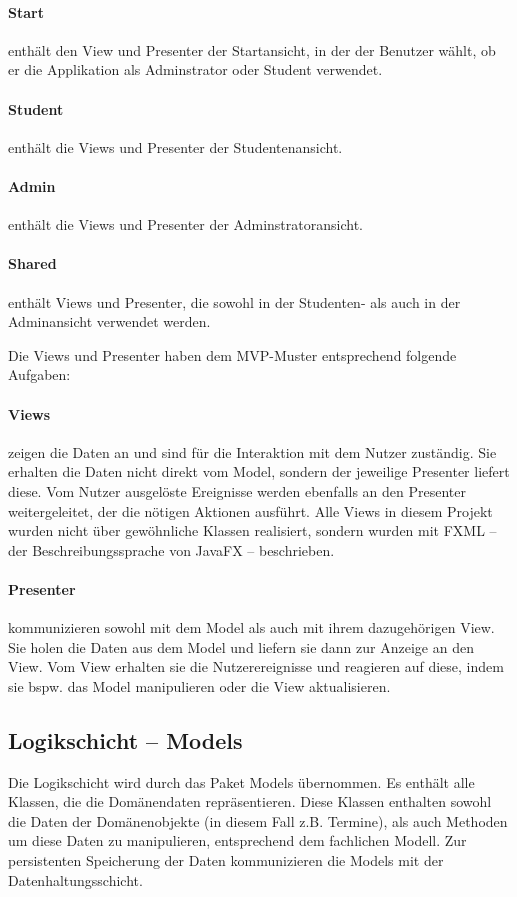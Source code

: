 \paragraph{Start} enthält den View und Presenter der Startansicht, in der der Benutzer wählt, ob er die Applikation als Adminstrator oder Student verwendet.
\paragraph{Student} enthält die Views und Presenter der Studentenansicht.
\paragraph{Admin} enthält die Views und Presenter der Adminstratoransicht.
\paragraph{Shared} enthält Views und Presenter, die sowohl in der Studenten- als auch in der Adminansicht verwendet werden.

Die Views und Presenter haben dem MVP-Muster entsprechend folgende Aufgaben:
\paragraph{Views} zeigen die Daten an und sind für die Interaktion mit dem Nutzer zuständig. Sie erhalten die Daten nicht direkt vom Model, sondern der jeweilige Presenter liefert diese. Vom Nutzer ausgelöste Ereignisse werden ebenfalls an den Presenter weitergeleitet, der die nötigen Aktionen ausführt. Alle Views in diesem Projekt wurden nicht über gewöhnliche Klassen realisiert, sondern wurden mit FXML – der Beschreibungssprache von JavaFX – beschrieben.
\paragraph{Presenter} kommunizieren sowohl mit dem Model als auch mit ihrem dazugehörigen View. Sie holen die Daten aus dem Model und liefern sie dann zur Anzeige an den View. Vom View erhalten sie die Nutzerereignisse und reagieren auf diese, indem sie bspw. das Model manipulieren oder die View aktualisieren.

\subsection{Logikschicht – Models}
Die Logikschicht wird durch das Paket Models übernommen. Es enthält alle Klassen, die die Domänendaten repräsentieren. Diese Klassen enthalten sowohl die Daten der Domänenobjekte (in diesem Fall z.B. Termine), als auch Methoden um diese Daten zu manipulieren, entsprechend dem fachlichen Modell. Zur persistenten Speicherung der Daten kommunizieren die Models mit der Datenhaltungsschicht.


